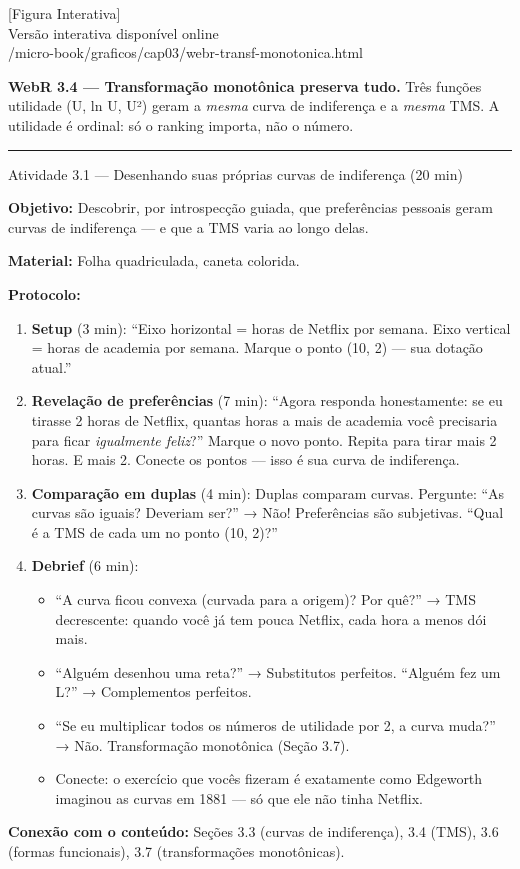 \documentclass[11pt,twoside,openright]{book}
\newcommand{\figurePlaceholder}[1]{%
  \begin{center}
    \begin{tcolorbox}[
      width=0.85\textwidth,
      colback=graybg,
      colframe=gray,
      boxrule=0.5pt,
      arc=2pt,
      halign=center,
      valign=center,
      height=5cm
    ]
      \centering
      \vfill
      {\sffamily\color{gray}\large [Figura Interativa]}\\[6pt]
      {\sffamily\small\color{gray} Versão interativa disponível online}\\[4pt]
      {\ttfamily\tiny\color{gray} #1}
      \vfill
    \end{tcolorbox}
  \end{center}
}
\providecommand{\tightlist}{\setlength{\itemsep}{0pt}\setlength{\parskip}{0pt}}
\begin{document}
\figurePlaceholder{/micro-book/graficos/cap03/webr-transf-monotonica.html}

\textbf{WebR 3.4 --- Transformação monotônica preserva tudo.} Três
funções utilidade (U, ln U, U²) geram a \emph{mesma} curva de
indiferença e a \emph{mesma} TMS. A utilidade é ordinal: só o ranking
importa, não o número.

\begin{center}\rule{0.5\linewidth}{0.5pt}\end{center}

\begin{classroombox}{Atividade 3.1 — Desenhando suas próprias curvas de indiferença (20 min)}

\textbf{Objetivo:} Descobrir, por introspecção guiada, que preferências
pessoais geram curvas de indiferença --- e que a TMS varia ao longo
delas.

\textbf{Material:} Folha quadriculada, caneta colorida.

\textbf{Protocolo:}

\begin{enumerate}
\def\labelenumi{\arabic{enumi}.}
\tightlist
\item
  \textbf{Setup} (3 min): ``Eixo horizontal = horas de Netflix por
  semana. Eixo vertical = horas de academia por semana. Marque o ponto
  (10, 2) --- sua dotação atual.''
\item
  \textbf{Revelação de preferências} (7 min): ``Agora responda
  honestamente: se eu tirasse 2 horas de Netflix, quantas horas a mais
  de academia você precisaria para ficar \emph{igualmente feliz}?''
  Marque o novo ponto. Repita para tirar mais 2 horas. E mais 2. Conecte
  os pontos --- isso é sua curva de indiferença.
\item
  \textbf{Comparação em duplas} (4 min): Duplas comparam curvas.
  Pergunte: ``As curvas são iguais? Deveriam ser?'' → Não! Preferências
  são subjetivas. ``Qual é a TMS de cada um no ponto (10, 2)?''
\item
  \textbf{Debrief} (6 min):

  \begin{itemize}
  \tightlist
  \item
    ``A curva ficou convexa (curvada para a origem)? Por quê?'' → TMS
    decrescente: quando você já tem pouca Netflix, cada hora a menos dói
    mais.
  \item
    ``Alguém desenhou uma reta?'' → Substitutos perfeitos. ``Alguém fez
    um L?'' → Complementos perfeitos.
  \item
    ``Se eu multiplicar todos os números de utilidade por 2, a curva
    muda?'' → Não. Transformação monotônica (Seção 3.7).
  \item
    Conecte: o exercício que vocês fizeram é exatamente como Edgeworth
    imaginou as curvas em 1881 --- só que ele não tinha Netflix.
  \end{itemize}
\end{enumerate}

\textbf{Conexão com o conteúdo:} Seções 3.3 (curvas de indiferença), 3.4
(TMS), 3.6 (formas funcionais), 3.7 (transformações monotônicas).

\end{classroombox}
\end{document}
